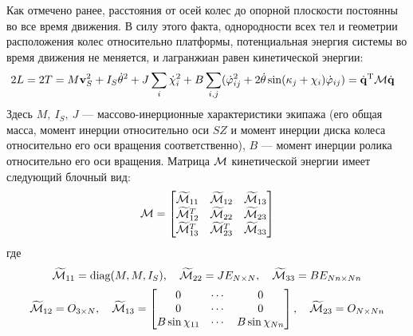 Как отмечено ранее, расстояния от осей колес до опорной плоскости постоянны во все время движения. В силу этого факта, однородности всех тел и геометрии расположения колес относительно платформы, потенциальная энергия системы во время движения не меняется, и лагранжиан равен кинетической энергии:
\begin{equation}\label{kin_en}
    \hspace{-8pt}
    2L = 2T = M\boldsymbol{\mathbf{v}}_S^2 + I_S\dot{\theta}^2 + J\sum_i\dot{\chi}_i^2 + B\sum_{i,j}(\dot{\varphi}_{ij}^2 + 2\dot{\theta}\sin(\kappa_j + \chi_i)\dot{\varphi}_{ij})=\dot{\boldsymbol{\mathbf{q}}}^\mathrm{T}\mathcal{M}\dot{\boldsymbol{\mathbf{q}}}
\end{equation}
Здесь $M,\ I_S,\ J$ --- массово-инерционные характеристики экипажа (его общая масса, момент инерции относительно оси $SZ$ и момент инерции диска колеса относительно его оси вращения соответственно), $B$ --- момент инерции ролика относительно его оси вращения. Матрица $\mathcal{M}$ кинетической энергии имеет следующий блочный вид:
$$
\mathcal{M} = \begin{bmatrix}
    \widetilde{\mathcal{M}}_{11}   & \widetilde{\mathcal{M}}_{12}   & \widetilde{\mathcal{M}}_{13} \\
    \widetilde{\mathcal{M}}_{12}^T & \widetilde{\mathcal{M}}_{22}   & \widetilde{\mathcal{M}}_{23} \\
    \widetilde{\mathcal{M}}_{13}^T & \widetilde{\mathcal{M}}_{23}^T & \widetilde{\mathcal{M}}_{33} \\
\end{bmatrix}
$$
где
$$
\widetilde{\mathcal{M}}_{11} = \text{diag}(M, M, I_S),
\quad
\widetilde{\mathcal{M}}_{22} = JE_{N \times N},
\quad
\widetilde{\mathcal{M}}_{33} = BE_{Nn \times Nn}
$$
$$
\widetilde{\M}_{12} = O_{3 \times N},
\quad
\widetilde{\M}_{13} = \begin{bmatrix}
        0                      & \cdots & 0                      \\
        0                      & \cdots & 0                      \\
        B\sin\chi_{11}         & \cdots & B\sin\chi_{Nn}         \\
    \end{bmatrix},
\quad
\widetilde{\M}_{23} = O_{N \times Nn}
\vsp
$$
